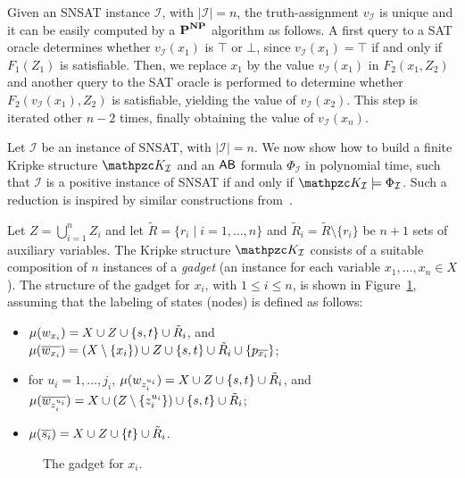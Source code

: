 Given an SNSAT instance $\mathcal{I}$, with $|\mathcal{I}|=n$, the truth-assignment $v_\mathcal{I}$ is unique and it can be easily computed by a $\textbf{P}^{\textbf{NP}}$ algorithm as follows. A first query to a SAT oracle determines whether $v_\mathcal{I}(x_1)$ is $\top$ or $\bot$, since $v_\mathcal{I}(x_1)=\top$ if and only if $F_1(Z_1)$ is satisfiable. Then, we replace $x_1$ by the value $v_\mathcal{I}(x_1)$ in $F_2(x_1,Z_2)$ and another query to the SAT oracle is performed to determine whether $F_2(v_\mathcal{I}(x_1),Z_2)$ is satisfiable, yielding the value of $v_\mathcal{I}(x_2)$. This step is iterated other $n-2$ times, finally obtaining the value of $v_\mathcal{I}(x_n)$. 

Let $\mathcal{I}$ be an instance of SNSAT, with $|\mathcal{I}|=n$. We now show how to build a finite Kripke structure $\Ku_\mathcal{I}$ and an $\mathsf{AB}$ formula $\Phi_\mathcal{I}$ in polynomial time, such that $\mathcal{I}$ is a positive instance of SNSAT if and only if $\Ku_\mathcal{I}\models \Phi_\mathcal{I}$. Such a reduction is inspired by similar constructions from~\cite{LMS01}.

Let $Z=\bigcup_{i=1}^n Z_i$ and let $\tilde{R}=\{r_i \mid i=1,\ldots , n\}$ and $\tilde{R}_i=\tilde{R}\setminus \{r_i\}$ be $n+1$ sets of auxiliary variables.
The Kripke structure $\Ku_\mathcal{I}$ consists of a suitable composition of $n$ instances of a \emph{gadget} (an instance  for each variable $x_1,\ldots , x_n\in X$). The structure of the gadget for $x_i$, with $1\leq i\leq n$, is shown in Figure~\ref{gadget}, assuming that the labeling of states (nodes) is defined as follows:
\begin{itemize}
	\item $\mu(w_{x_i})=X \cup Z \cup \{s,t\} \cup \tilde{R}_i$, and
    	$\mu(\overline{w_{x_i}})=(X\setminus \{x_i\}) \cup Z \cup \{s,t\} \cup \tilde{R}_i \cup \{p_{\overline{x_i}}\}$;
	\item for $u_i=1,\ldots , j_i$, $\mu(w_{z_i^{u_i}})=X \cup Z \cup \{s,t\} \cup \tilde{R}_i$, and\\
	    $\mu(\overline{w_{z_i^{u_i}}})=X \cup (Z\setminus \{z_i^{u_i}\}) \cup \{s,t\} \cup \tilde{R}_i$;
	\item $\mu(\overline{s_i})=X \cup Z \cup \{t\} \cup \tilde{R}_i$.
\end{itemize}

\begin{figure}[p]
  \centering
  
  \caption{The gadget for $x_i$.}\label{gadget}
\end{figure}

